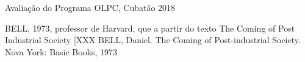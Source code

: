 \documentclass[
12pt,		%
openright,	%
twoside,  %
a4paper,			%
chapter=TITLE,		%
english,			%
french,				%
spanish,			%
brazil				%
]{USPSC-classe/USPSC_RedarTex}
\begin{document}
\begin{flushleft}
\begin{flushleft}
\begin{flushleft}
\begin{flushleft}
\begin{flushleft}
\begin{flushleft}
\begin{flushleft}
\begin{flushleft}
\begin{flushleft}
\begin{flushleft}
 Avalia\c{c}\~ao do Programa OLPC, Cubat\~ao 2018
\end{flushleft}


\end{flushleft}


\end{flushleft}


\end{flushleft}


\end{flushleft}


\end{flushleft}


\end{flushleft}


\end{flushleft}


\end{flushleft}


\end{flushleft}


\begin{flushleft}
\begin{flushleft}
\begin{flushleft}
\begin{flushleft}
\begin{flushleft}
\begin{flushleft}
\begin{flushleft}
\begin{flushleft}
\begin{flushleft}
\begin{flushleft}
[BELL, 1973]  BELL, 1973, professor de Harvard, que a partir do texto The Coming of Post Industrial Society [XXX BELL, Daniel. The Coming of Post-industrial Society. Nova York: Basic Books, 1973
\end{flushleft}


\end{flushleft}


\end{flushleft}


\end{flushleft}


\end{flushleft}


\end{flushleft}


\end{flushleft}


\end{flushleft}


\end{flushleft}


\end{flushleft}
\end{document}
